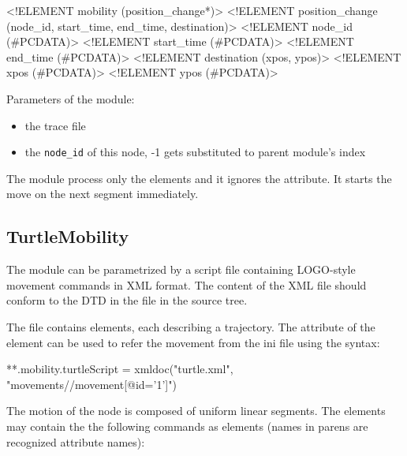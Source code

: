 \begin{description}
\begin{XML}
<!ELEMENT mobility (position_change*)>
<!ELEMENT position_change (node_id, start_time, end_time, destination)>
<!ELEMENT node_id (#PCDATA)>
<!ELEMENT start_time (#PCDATA)>
<!ELEMENT end_time (#PCDATA)>
<!ELEMENT destination (xpos, ypos)>
<!ELEMENT xpos (#PCDATA)>
<!ELEMENT ypos (#PCDATA)>
\end{XML}

Parameters of the module:

\begin{itemize}
  \item {} the trace file
  \item {} the \verb!node_id! of this node, -1 gets substituted to
  parent module's index
\end{itemize}

\begin{note}
The  module process only the 
elements and it ignores the  attribute. It starts the move
on the next segment immediately.
\end{note}


\end{description}


\subsection{TurtleMobility}

The  module can be parametrized by a script file
containing LOGO-style movement commands in XML format. The content of 
the XML file should conform to the DTD in the 
file in the source tree.

The file contains  elements, each describing a trajectory.
The  attribute of the  element can be used to
refer the movement from the ini file using the syntax:

\begin{inifile}
**.mobility.turtleScript = xmldoc("turtle.xml", "movements//movement[@id='1']")
\end{inifile}

The motion of the node is composed of uniform linear segments.
The  elements may contain the the following commands as
elements (names in parens are recognized attribute names):

